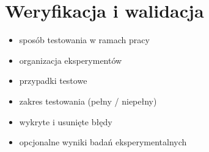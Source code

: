 \chapter{Weryfikacja i walidacja} 
{
\begin{itemize}
    \item sposób testowania w ramach pracy
    \item organizacja eksperymentów
    \item przypadki testowe
    \item zakres testowania (pełny / niepełny)
    \item wykryte i usunięte błędy
    \item opcjonalne wyniki badań eksperymentalnych
\end{itemize}
}